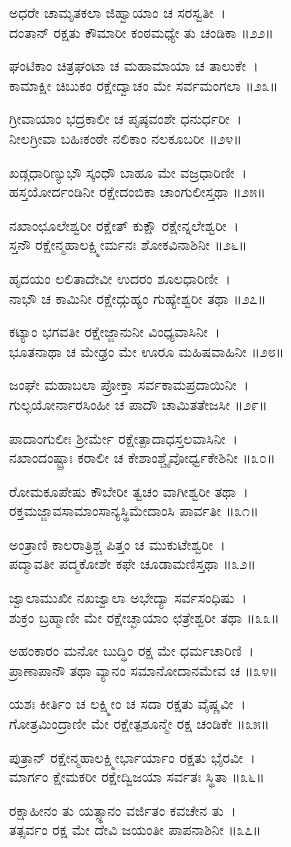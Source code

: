 ಅಧರೇ ಚಾಮೃತಕಲಾ ಜಿಹ್ವಾಯಾಂ ಚ ಸರಸ್ವತೀ~।\\
ದಂತಾನ್ ರಕ್ಷತು ಕೌಮಾರೀ ಕಂಠಮಧ್ಯೇ ತು ಚಂಡಿಕಾ ॥೨೨॥

ಘಂಟಿಕಾಂ ಚಿತ್ರಘಂಟಾ ಚ ಮಹಾಮಾಯಾ ಚ ತಾಲುಕೇ~।\\
ಕಾಮಾಕ್ಷೀ ಚಿಬುಕಂ ರಕ್ಷೇದ್ವಾಚಂ ಮೇ ಸರ್ವಮಂಗಲಾ ॥೨೩॥

ಗ್ರೀವಾಯಾಂ ಭದ್ರಕಾಲೀ ಚ ಪೃಷ್ಠವಂಶೇ ಧನುರ್ಧರೀ~।\\
ನೀಲಗ್ರೀವಾ ಬಹಿಃಕಂಠೇ ನಲಿಕಾಂ ನಲಕೂಬರೀ ॥೨೪॥

ಖಡ್ಗಧಾರಿಣ್ಯುಭೌ ಸ್ಕಂಧೌ ಬಾಹೂ ಮೇ ವಜ್ರಧಾರಿಣೀ~।\\
ಹಸ್ತಯೋರ್ದಂಡಿನೀ ರಕ್ಷೇದಂಬಿಕಾ ಚಾಂಗುಲೀಸ್ತಥಾ ॥೨೫॥

ನಖಾಂಛೂಲೇಶ್ವರೀ ರಕ್ಷೇತ್ ಕುಕ್ಷೌ ರಕ್ಷೇನ್ನಲೇಶ್ವರೀ~।\\
ಸ್ತನೌ ರಕ್ಷೇನ್ಮಹಾಲಕ್ಷ್ಮೀರ್ಮನಃ ಶೋಕವಿನಾಶಿನೀ ॥೨೬॥

ಹೃದಯಂ ಲಲಿತಾದೇವೀ ಉದರಂ ಶೂಲಧಾರಿಣೀ~।\\
ನಾಭೌ ಚ ಕಾಮಿನೀ ರಕ್ಷೇದ್ಗುಹ್ಯಂ ಗುಹ್ಯೇಶ್ವರೀ ತಥಾ ॥೨೭॥

ಕಟ್ಯಾಂ ಭಗವತೀ ರಕ್ಷೇಜ್ಜಾನುನೀ ವಿಂಧ್ಯವಾಸಿನೀ~।\\
ಭೂತನಾಥಾ ಚ ಮೇಢ್ರಂ ಮೇ ಊರೂ ಮಹಿಷವಾಹಿನೀ ॥೨೮॥

ಜಂಘೇ ಮಹಾಬಲಾ ಪ್ರೋಕ್ತಾ ಸರ್ವಕಾಮಪ್ರದಾಯಿನೀ~।\\
ಗುಲ್ಫಯೋರ್ನಾರಸಿಂಹೀ ಚ ಪಾದೌ ಚಾಮಿತತೇಜಸೀ ॥೨೯॥

ಪಾದಾಂಗುಲೀಃ ಶ್ರೀರ್ಮೇ ರಕ್ಷೇತ್ಪಾದಾಧಸ್ತಲವಾಸಿನೀ~।\\
ನಖಾಂದಂಷ್ಟ್ರಾಃ ಕರಾಲೀ ಚ ಕೇಶಾಂಶ್ಚೈವೋರ್ಧ್ವಕೇಶಿನೀ ॥೩೦॥

ರೋಮಕೂಪೇಷು ಕೌಬೇರೀ ತ್ವಚಂ ವಾಗೀಶ್ವರೀ ತಥಾ~।\\
ರಕ್ತಮಜ್ಜಾವಸಾಮಾಂಸಾನ್ಯಸ್ಥಿಮೇದಾಂಸಿ ಪಾರ್ವತೀ ॥೩೧॥

ಅಂತ್ರಾಣಿ ಕಾಲರಾತ್ರಿಶ್ಚ ಪಿತ್ತಂ ಚ ಮುಕುಟೇಶ್ವರೀ~।\\
ಪದ್ಮಾವತೀ ಪದ್ಮಕೋಶೇ ಕಫೇ ಚೂಡಾಮಣಿಸ್ತಥಾ ॥೩೨॥

ಜ್ವಾಲಾಮುಖೀ ನಖಜ್ವಾಲಾ ಅಭೇದ್ಯಾ ಸರ್ವಸಂಧಿಷು~।\\
ಶುಕ್ರಂ ಬ್ರಹ್ಮಾಣೀ ಮೇ ರಕ್ಷೇಚ್ಛಾಯಾಂ ಛತ್ರೇಶ್ವರೀ ತಥಾ ॥೩೩॥

ಅಹಂಕಾರಂ ಮನೋ ಬುದ್ಧಿಂ ರಕ್ಷ ಮೇ ಧರ್ಮಚಾರಿಣಿ~।\\
ಪ್ರಾಣಾಪಾನೌ ತಥಾ ವ್ಯಾನಂ ಸಮಾನೋದಾನಮೇವ ಚ ॥೩೪॥

ಯಶಃ ಕೀರ್ತಿಂ ಚ ಲಕ್ಷ್ಮೀಂ ಚ ಸದಾ ರಕ್ಷತು ವೈಷ್ಣವೀ~।\\
ಗೋತ್ರಮಿಂದ್ರಾಣೀ ಮೇ ರಕ್ಷೇತ್ಪಶೂನ್ಮೇ ರಕ್ಷ ಚಂಡಿಕೇ ॥೩೫॥

ಪುತ್ರಾನ್ ರಕ್ಷೇನ್ಮಹಾಲಕ್ಷ್ಮೀರ್ಭಾರ್ಯಾಂ ರಕ್ಷತು ಭೈರವೀ~।\\
ಮಾರ್ಗಂ ಕ್ಷೇಮಕರೀ ರಕ್ಷೇದ್ವಿಜಯಾ ಸರ್ವತಃ ಸ್ಥಿತಾ ॥೩೬॥

ರಕ್ಷಾಹೀನಂ ತು ಯತ್ಸ್ಥಾನಂ ವರ್ಜಿತಂ ಕವಚೇನ ತು~।\\
ತತ್ಸರ್ವಂ ರಕ್ಷ ಮೇ ದೇವಿ ಜಯಂತೀ ಪಾಪನಾಶಿನೀ ॥೩೭॥

